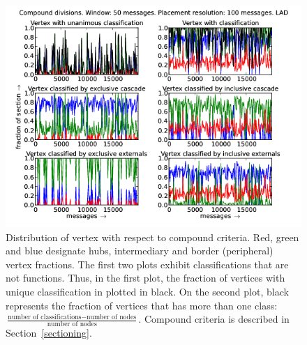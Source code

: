 \documentclass[%
 aip,
 jmp,%
 amsmath,amssymb,
 reprint,%
]{revtex4-1}
\begin{document}
\begin{figure}[hbtp] 
   \centering
        \includegraphics[width=\textwidth]{figs/LAD/50_2}
    \caption{Distribution of vertex with respect to compound criteria. Red, green and blue designate hubs, intermediary and border (peripheral) vertex fractions. The first two plots exhibit classifications that are not functions. Thus, in the first plot, the fraction of vertices with unique classification in plotted in black. On the second plot, black represents the fraction of vertices that has more than one class: $\frac{\text{number of classifications} - \text{number of nodes}}{\text{number of nodes}}$. Compound criteria is described in Section~\ref{sectioning}.}
    \label{fig:lad50_}
\end{figure}





%
%




\nocite{*}
\end{document}
